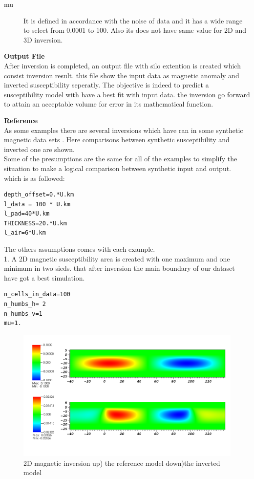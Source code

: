 \begin{description} 	

\item[mu]
It is defined in accordance with the noise of data and it has a wide range to select from 0.0001 to 100. Also its does not have same value for 2D and 3D inversion.

\end{description}

\textbf{Output File}\\

After inversion is completed, an output file with silo extention is created which consist inversion result. this file show the input data as magnetic anomaly and inverted susceptibility seperatly. The objective is indeed to  predict a susceptibility model with have a best fit with input data. the inversion go forward to attain an acceptable volume for error in its mathematical function. 


\textbf{Reference}\\

As some examples there are several inversions which have ran in some synthetic magnetic data sets . Here comparisons between synthetic susceptibility and inverted one are shown.\\
Some of the presumptions are the same for all of the examples to simplify the situation to make a logical comparison between synthetic input and output. which is as followed:\\
\begin{verbatim}
depth_offset=0.*U.km
l_data = 100 * U.km
l_pad=40*U.km
THICKNESS=20.*U.km
l_air=6*U.km
\end{verbatim}
The others assumptions comes with each example.\\

1. A 2D magnetic susceptibility area is created with one maximum and one minimum in two sieds. that after inversion the main boundary of our dataset  have got a best simulation.\\ 
\begin{verbatim}
n_cells_in_data=100
n_humbs_h= 2
n_humbs_v=1
mu=1.
\end{verbatim}

\begin{figure}
\centering
\includegraphics[width=\textwidth]{mag2D2.png}
\caption{2D magnetic inversion up) the reference model  down)the inverted model}

\end{figure}

